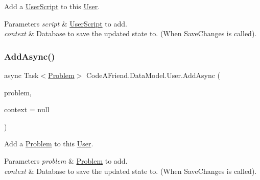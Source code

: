 Add a \mbox{\hyperlink{class_code_a_friend_1_1_data_model_1_1_user_script}{User\+Script}} to this \mbox{\hyperlink{class_code_a_friend_1_1_data_model_1_1_user}{User}}. 


\begin{DoxyParams}{Parameters}
{\em script} & \mbox{\hyperlink{class_code_a_friend_1_1_data_model_1_1_user_script}{User\+Script}} to add.\\
\hline
{\em context} & Database to save the updated state to. (When Save\+Changes is called).\\
\hline
\end{DoxyParams}
\mbox{\label{class_code_a_friend_1_1_data_model_1_1_user_a15aa0e1bb20abcd45da38e11f30bb6e4}} 
\subsubsection{\texorpdfstring{Add\+Async()}{AddAsync()}\hspace{0.1cm}{\footnotesize\ttfamily [2/2]}}
{\footnotesize\ttfamily async Task$<$\mbox{\hyperlink{class_code_a_friend_1_1_data_model_1_1_problem}{Problem}}$>$ Code\+A\+Friend.\+Data\+Model.\+User.\+Add\+Async (\begin{DoxyParamCaption}\item[{\mbox{\hyperlink{class_code_a_friend_1_1_data_model_1_1_user_1_1_add_problem_command}{Add\+Problem\+Command}}}]{problem,  }\item[{Db\+Context}]{context = {\ttfamily null} }\end{DoxyParamCaption})}



Add a \mbox{\hyperlink{class_code_a_friend_1_1_data_model_1_1_problem}{Problem}} to this \mbox{\hyperlink{class_code_a_friend_1_1_data_model_1_1_user}{User}}. 


\begin{DoxyParams}{Parameters}
{\em problem} & \mbox{\hyperlink{class_code_a_friend_1_1_data_model_1_1_problem}{Problem}} to add.\\
\hline
{\em context} & Database to save the updated state to. (When Save\+Changes is called).\\
\hline
\end{DoxyParams}


